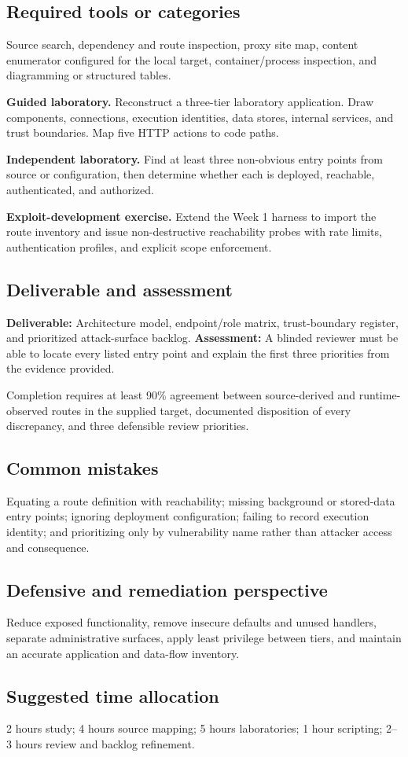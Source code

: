 \documentclass[11pt]{article}
\newcommand{\weekfield}[2]{%
  \Needspace{5\baselineskip}
  \subsection*{#1}
  #2
}
\newcommand{\deliverable}[1]{\textbf{Deliverable:} #1}
\newcommand{\assessment}[1]{\textbf{Assessment:} #1}
\begin{document}
\weekfield{Required tools or categories}{Source search, dependency and route
inspection, proxy site map, content enumerator configured for the local target,
container/process inspection, and diagramming or structured tables.}

\begin{labbox}
\textbf{Guided laboratory.} Reconstruct a three-tier laboratory application.
Draw components, connections, execution identities, data stores, internal
services, and trust boundaries. Map five HTTP actions to code paths.

\textbf{Independent laboratory.} Find at least three non-obvious entry points
from source or configuration, then determine whether each is deployed, reachable,
authenticated, and authorized.

\textbf{Exploit-development exercise.} Extend the Week 1 harness to import the
route inventory and issue non-destructive reachability probes with rate limits,
authentication profiles, and explicit scope enforcement.
\end{labbox}

\weekfield{Deliverable and assessment}{\deliverable{Architecture model,
endpoint/role matrix, trust-boundary register, and prioritized attack-surface
backlog.} \assessment{A blinded reviewer must be able to locate every listed
entry point and explain the first three priorities from the evidence provided.}}

\begin{checkpoints}
Completion requires at least 90\% agreement between source-derived and
runtime-observed routes in the supplied target, documented disposition of every
discrepancy, and three defensible review priorities.
\end{checkpoints}

\weekfield{Common mistakes}{Equating a route definition with reachability;
missing background or stored-data entry points; ignoring deployment configuration;
failing to record execution identity; and prioritizing only by vulnerability
name rather than attacker access and consequence.}

\weekfield{Defensive and remediation perspective}{Reduce exposed functionality,
remove insecure defaults and unused handlers, separate administrative surfaces,
apply least privilege between tiers, and maintain an accurate application and
data-flow inventory.}

\weekfield{Suggested time allocation}{2 hours study; 4 hours source mapping; 5
hours laboratories; 1 hour scripting; 2--3 hours review and backlog refinement.}
\end{document}
